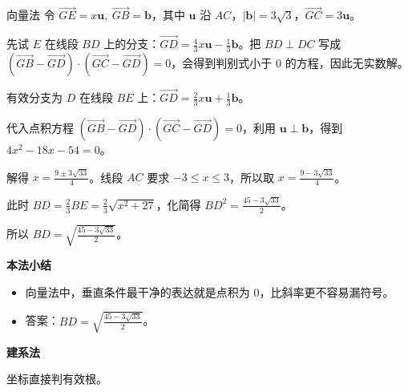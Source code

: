 \documentclass{exam-zh}
\newenvironment{eduSubQuestionItem}[1]{%
  \needspace{4\baselineskip}%
  \vspace{2mm}
  \par\noindent
  \hangindent=8mm\hangafter=1
  {\color{edu-blue}\bfseries #1}\enspace
  \begingroup
  \color{edu-ink}
}{%
  \endgroup
  \par
  \vspace{3mm}
}
\newenvironment{eduBulletList}{%
  \begin{itemize}[
    label=\textbullet,
    leftmargin=5mm,
    itemsep=1.2mm,
    topsep=0pt,
    parsep=0pt
  ]
}{%
  \end{itemize}
}
\begin{document}
\begin{eduSolutionBox}{向量法}
  \begingroup
  \setlength{\parskip}{2.5mm}
令 $\vec{GE}=x\mathbf u,\ \vec{GB}=\mathbf b$，其中 $\mathbf u$ 沿 $AC$，$|\mathbf b|=3\sqrt3$，$\vec{GC}=3\mathbf u$。\par
先试 $E$ 在线段 $BD$ 上的分支：$\vec{GD}=\frac43x\mathbf u-\frac13\mathbf b$。把 $BD\perp DC$ 写成 $(\vec{GB}-\vec{GD})\cdot(\vec{GC}-\vec{GD})=0$，会得到判别式小于 $0$ 的方程，因此无实数解。\par
有效分支为 $D$ 在线段 $BE$ 上：$\vec{GD}=\frac23x\mathbf u+\frac13\mathbf b$。\par
代入点积方程 $(\vec{GB}-\vec{GD})\cdot(\vec{GC}-\vec{GD})=0$，利用 $\mathbf u\perp\mathbf b$，得到 $4x^2-18x-54=0$。\par
解得 $x=\frac{9\pm3\sqrt{33}}4$。线段 $AC$ 要求 $-3\le x\le3$，所以取 $x=\frac{9-3\sqrt{33}}4$。\par
此时 $BD=\frac23BE=\frac23\sqrt{x^2+27}$，化简得 $BD^2=\frac{45-3\sqrt{33}}{2}$。\par
所以 $BD=\sqrt{\frac{45-3\sqrt{33}}{2}}$。\par
  \endgroup
  \vspace{2.5mm}
  {\color{edu-blue}\bfseries\small 本法小结}\par\vspace{1.5mm}
  \begin{eduBulletList}
    \item 向量法中，垂直条件最干净的表达就是点积为 $0$，比斜率更不容易漏符号。    \item 答案：$BD=\sqrt{\frac{45-3\sqrt{33}}{2}}$。  \end{eduBulletList}
\end{eduSolutionBox}




\begin{eduSubQuestionItem}{建系法}
坐标直接判有效根。\end{eduSubQuestionItem}
\end{document}
